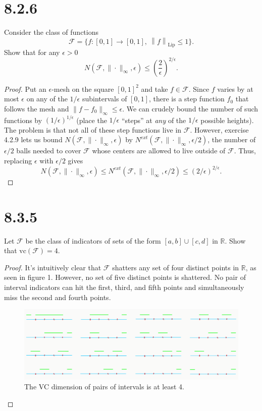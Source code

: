\documentclass[11pt,letterpaper]{report}
\newcommand{\reals}{\mathbb{R}}
\newcommand{\mcal}[1]{\mathcal{#1}}
\newcommand{\Lip}[1]{\left\|{#1}\right\|_{\text{Lip}}}
\newcommand{\vc}{\text{vc}}
\begin{document}
\section*{8.2.6}
Consider the class of functions
\[
\mcal{F} = \{f:[0,1]\to [0,1],\ \Lip{f}\leq 1\}.
\]
Show that for any $\epsilon>0$
\[
N(\mcal{F}, \|\cdot\|_\infty, \epsilon)\leq \left(\frac{2}{\epsilon}\right)^{2/\epsilon}.
\]
\begin{proof}
	Put an $\epsilon$-mesh on the square $[0,1]^2$ and take $f\in \mcal{F}$. Since $f$ varies by at most $\epsilon$ on any of the $1/\epsilon$ subintervals of $[0,1]$, there is a step function $f_0$ that follows the mesh and $\|f-f_0\|_\infty \leq \epsilon$. We can crudely bound the number of such functions by $(1/\epsilon)^{1/\epsilon}$ (place the $1/\epsilon$ ``steps'' at \textit{any} of the $1/\epsilon$ possible heights). The problem is that not all of these step functions live in $\mcal{F}$. However, exercise 4.2.9 lets us bound $N(\mcal{F}, \|\cdot \|_\infty, \epsilon)$ by $N^{ext}(\mcal{F}, \|\cdot\|_\infty, \epsilon/2)$, the number of $\epsilon/2$ balls needed to cover $\mcal{F}$ whose centers are allowed to live outside of $\mcal{F}$. Thus, replacing $\epsilon$ with $\epsilon/2$ gives
	\[
	N(\mcal{F}, \|\cdot\|_\infty, \epsilon)\leq N^{ext}(\mcal{F}, \|\cdot\|_\infty, \epsilon/2) \leq (2/\epsilon)^{2/\epsilon}.
	\]
\end{proof}










\section*{8.3.5}
Let $\mcal{F}$ be the class of indicators of sets of the form $[a,b]\cup [c,d]$ in $\reals$. Show that $\vc(\mcal{F}) = 4$.
\begin{proof}
	It's intuitively clear that $\mcal{F}$ shatters any set of four distinct points in $\reals$, as seen in figure 1. However, no set of five distinct points is shattered. No pair of interval indicators can hit the first, third, and fifth points and simultaneously miss the second and fourth points.

	\begin{figure}[ht]\label{intervals}
		\centering
			\includegraphics[scale=.4]{intervals.PNG}
			\caption{The VC dimension of pairs of intervals is at least 4.}
	\end{figure}
\end{proof}
\end{document}
